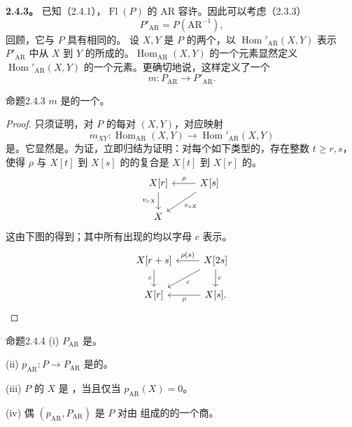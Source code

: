 \textbf{2.4.3。} 已知（2.4.1），$\operatorname{Fl}(P)$ 的 $\mathrm{AR}$ 容许。因此可以考虑（2.3.3）
\[
P'_{\mathrm{AR}}=P(\mathrm{AR}^{-1}),
\]
回顾，它与 $P$ 具有相同的。
设 $X,Y$ 是 $P$ 的两个，以 $\operatorname{Hom}'_{\mathrm{AR}}(X,Y)$ 表示 $P'_{\mathrm{AR}}$ 中从 $X$ 到 $Y$ 的所成的。$\operatorname{Hom}_{\mathrm{AR}}(X,Y)$ 的一个元素显然定义 $\operatorname{Hom}'_{\mathrm{AR}}(X,Y)$ 的一个元素。更确切地说，这样定义了一个
\[
m:P_{\mathrm{AR}}\longrightarrow P'_{\mathrm{AR}}.
\]
\begin{SGAresult}{命题}{2.4.3}
 $m$ 是的一个。
\end{SGAresult}
\begin{proof}只须证明，对 $P$ 的每对 $(X,Y)$，对应映射
\[
m_{XY}:\operatorname{Hom}_{\mathrm{AR}}(X,Y)\longrightarrow\operatorname{Hom}'_{\mathrm{AR}}(X,Y)
\]
是。它显然是。为证，立即归结为证明：对每个如下类型的，存在整数 $t\geq r,s$，使得 $\rho$ 与 $X[t]$ 到 $X[s]$ 的的复合是 $X[t]$ 到 $X[r]$ 的。
\[
\begin{tikzcd}X[r]\arrow[d,"v_{rX}"']&X[s]\arrow[l,"\rho"']\arrow[dl,"v_{sX}"]\\X&\end{tikzcd}
\]
这由下图的得到；其中所有出现的均以字母 $c$ 表示。
\[
\begin{tikzcd}X[r+s]\arrow[d,"c"']&X[2s]\arrow[l,"\rho(s)"']\arrow[d,"c"]\arrow[dl,"c"]\\X[r]&X[s]\arrow[l,"\rho"].\end{tikzcd}
\]
\end{proof}
\begin{SGAresult}{命题}{2.4.4}
(i)  $P_{\mathrm{AR}}$ 是。

(ii)  $p_{\mathrm{AR}}:P\to P_{\mathrm{AR}}$ 是的。

(iii) $P$ 的 $X$ 是 ，当且仅当 $p_{\mathrm{AR}}(X)=0$。

(iv) 偶 $(p_{\mathrm{AR}},P_{\mathrm{AR}})$ 是 $P$ 对由 组成的的一个商。
\end{SGAresult}
